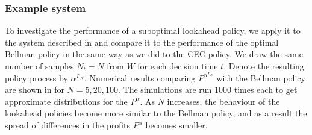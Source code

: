 \documentclass[main.tex]{subfiles}
\begin{document}
\subsubsection{Example system}
To investigate the performance of a suboptimal lookahead
policy, we apply it to the system described in
 and compare it to the performance
of the optimal Bellman policy in the same way as we did to the CEC
policy. We draw the same number of samples $N_t=N$ from $W$ for each
decision time $t$. Denote the resulting policy process
by $\alpha^{L_N}$. Numerical results comparing $P^{\alpha^{L_N}}$ with the
Bellman policy are shown in 
for $N=5,20,100$. The simulations are run $1000$ times each to get
approximate distributions for the $P^\alpha$.
As $N$ increases, the behaviour of the lookahead policies become more
similar to the Bellman policy, and as a result the spread of differences in the
profits $P^\alpha$ becomes smaller.
\end{document}
